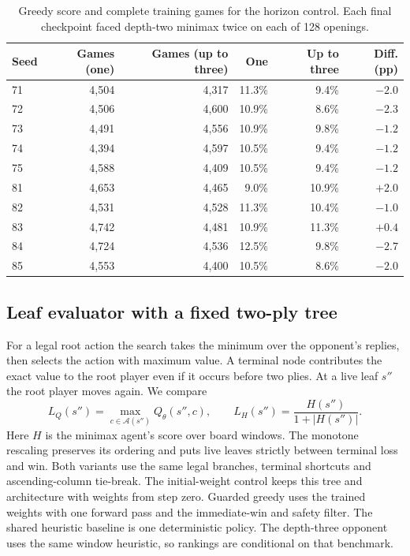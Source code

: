 \documentclass[letterpaper]{article}
\begin{document}
\begin{table}[!htbp]
\centering\small
\caption{Greedy score and complete training games for the horizon control. Each final checkpoint faced depth-two minimax twice on each of 128 openings.}
\label{tab:horizon-seeds}
\begin{tabular}{@{}lrrrrr@{}}
\toprule
Seed & Games (one) & Games (up to three) & One & Up to three & Diff. (pp)\\
\midrule
71 & 4,504 & 4,317 & 11.3\% & 9.4\% & $-2.0$\\
72 & 4,506 & 4,600 & 10.9\% & 8.6\% & $-2.3$\\
73 & 4,491 & 4,556 & 10.9\% & 9.8\% & $-1.2$\\
74 & 4,394 & 4,597 & 10.5\% & 9.4\% & $-1.2$\\
75 & 4,588 & 4,409 & 10.5\% & 9.4\% & $-1.2$\\
\midrule
81 & 4,653 & 4,465 & 9.0\% & 10.9\% & $+2.0$\\
82 & 4,531 & 4,528 & 11.3\% & 10.4\% & $-1.0$\\
83 & 4,742 & 4,481 & 10.9\% & 11.3\% & $+0.4$\\
84 & 4,724 & 4,536 & 12.5\% & 9.8\% & $-2.7$\\
85 & 4,553 & 4,400 & 10.5\% & 8.6\% & $-2.0$\\
\bottomrule
\end{tabular}
\end{table}

\subsection{Leaf evaluator with a fixed two-ply tree}
For a legal root action the search takes the minimum over the opponent's
replies, then selects the action with maximum value. A terminal node
contributes the exact value to the root player even if it occurs before
two plies. At a live leaf $s''$ the root player moves again. We compare
\begin{equation}
 L_Q(s'')=\max_{c\in\mathcal A(s'')}Q_\theta(s'',c),\qquad
 L_H(s'')=\frac{H(s'')}{1+|H(s'')|}.
\end{equation}
Here $H$ is the minimax agent's score over board windows. The monotone
rescaling preserves its ordering and puts live leaves strictly between
terminal loss and win. Both variants use the same legal branches,
terminal shortcuts and ascending-column tie-break. The initial-weight
control keeps this tree and architecture with weights from step zero.
Guarded greedy uses the trained weights with one forward pass and the
immediate-win and safety filter. The shared heuristic baseline is one
deterministic policy. The depth-three opponent uses the same window
heuristic, so rankings are conditional on that benchmark.
\end{document}
